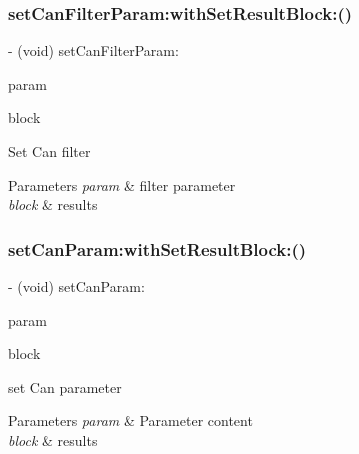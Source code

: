 \subsubsection{\texorpdfstring{set\+Can\+Filter\+Param\+:with\+Set\+Result\+Block\+:()}{setCanFilterParam:withSetResultBlock:()}}
{\footnotesize\ttfamily -\/ (void) set\+Can\+Filter\+Param\+: \begin{DoxyParamCaption}\item[{(\hyperlink{struct_p_v_s_d_k___m_o_u_n_t_a_p_i___c_a_n___f_i_l_t_e_r___p_a_r_a_m}{P\+V\+S\+D\+K\+\_\+\+M\+O\+U\+N\+T\+A\+P\+I\+\_\+\+C\+A\+N\+\_\+\+F\+I\+L\+T\+E\+R\+\_\+\+P\+A\+R\+AM})}]{param }\item[{withSetResultBlock:(P\+V\+Set\+Can\+Filter\+Param\+Result\+Block)}]{block }\end{DoxyParamCaption}}

Set Can filter


\begin{DoxyParams}{Parameters}
{\em param} & filter parameter \\
\hline
{\em block} & results \\
\hline
\end{DoxyParams}
\mbox{\label{interface_p_v_mount_controller_aebef7ccd20015622ac2723646a5207e5}} 
\subsubsection{\texorpdfstring{set\+Can\+Param\+:with\+Set\+Result\+Block\+:()}{setCanParam:withSetResultBlock:()}}
{\footnotesize\ttfamily -\/ (void) set\+Can\+Param\+: \begin{DoxyParamCaption}\item[{(\hyperlink{struct_p_v_s_d_k___m_o_u_n_t_a_p_i___c_a_n___p_a_r_a_m}{P\+V\+S\+D\+K\+\_\+\+M\+O\+U\+N\+T\+A\+P\+I\+\_\+\+C\+A\+N\+\_\+\+P\+A\+R\+AM})}]{param }\item[{withSetResultBlock:(P\+V\+Set\+Param\+Result\+Block)}]{block }\end{DoxyParamCaption}}

set Can parameter


\begin{DoxyParams}{Parameters}
{\em param} & Parameter content \\
\hline
{\em block} & results \\
\hline
\end{DoxyParams}
\mbox{\label{interface_p_v_mount_controller_af77e33c83c47ac2ab0fc5068f910cddb}} 
